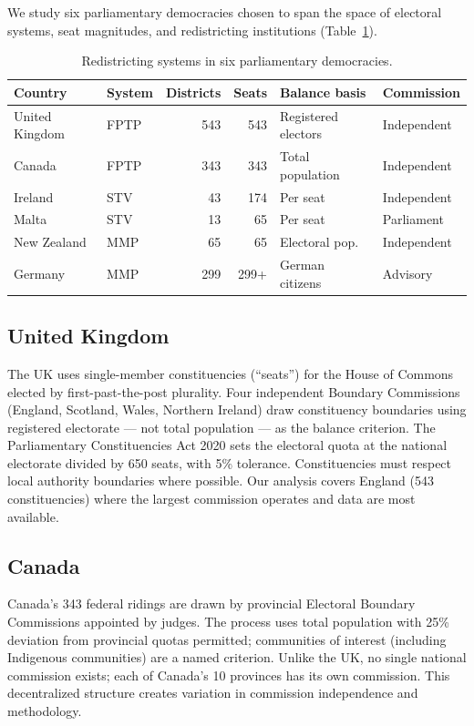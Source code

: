 We study six parliamentary democracies chosen to span the space of electoral systems, seat magnitudes, and redistricting institutions (Table~\ref{tab:country-comparison}).

\begin{table}[h]
\centering
\caption{Redistricting systems in six parliamentary democracies.}
\label{tab:country-comparison}
\small
\begin{tabular}{llrrll}
\toprule
Country & System & Districts & Seats & Balance basis & Commission \\
\midrule
United Kingdom & FPTP & 543 & 543 & Registered electors & Independent \\
Canada & FPTP & 343 & 343 & Total population & Independent \\
Ireland & STV & 43 & 174 & Per seat & Independent \\
Malta & STV & 13 & 65 & Per seat & Parliament \\
New Zealand & MMP & 65 & 65 & Electoral pop. & Independent \\
Germany & MMP & 299 & 299+ & German citizens & Advisory \\
\bottomrule
\end{tabular}
\end{table}

\subsection{United Kingdom}

The UK uses single-member constituencies (``seats'') for the House of Commons elected by first-past-the-post plurality. Four independent Boundary Commissions (England, Scotland, Wales, Northern Ireland) draw constituency boundaries using registered electorate --- not total population --- as the balance criterion. The Parliamentary Constituencies Act 2020 sets the electoral quota at the national electorate divided by 650 seats, with 5\% tolerance. Constituencies must respect local authority boundaries where possible. Our analysis covers England (543 constituencies) where the largest commission operates and data are most available.

\subsection{Canada}

Canada's 343 federal ridings are drawn by provincial Electoral Boundary Commissions appointed by judges. The process uses total population with 25\% deviation from provincial quotas permitted; communities of interest (including Indigenous communities) are a named criterion. Unlike the UK, no single national commission exists; each of Canada's 10 provinces has its own commission. This decentralized structure creates variation in commission independence and methodology.

